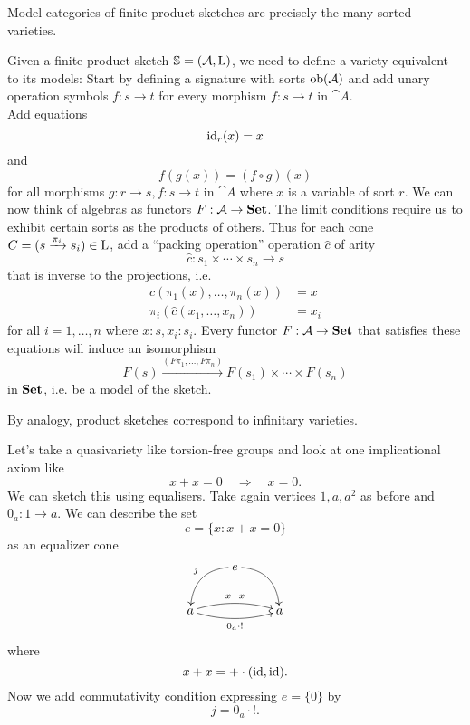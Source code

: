 \begin{Proposition}
Model categories of finite product sketches are precisely the many-sorted varieties.
\end{Proposition}
\begin{Proof}
Given a finite product sketch $\mathbb S = (\mathcal{A}, \textrm{L})$, we need to define a variety equivalent to its models: Start by defining a signature with sorts $\textrm{ob}(\mathcal{A})$ and add unary operation symbols $f : s \to t$ for every morphism $f : s \to t$ in $\cat A$. \\

Add equations
\[ \textrm{id}_r(x) = x \]
and
\[ f(g(x)) = (f \circ g)(x)  \]
for all morphisms $g : r \to s, f : s \to t$ in $\cat A$ where $x$ is a variable of sort $r$. We can now think of algebras as functors $F : \mathcal{A} \to \mathbf{Set}$. The limit conditions require us to exhibit certain sorts as the products of others. Thus for each cone $C = (s \xrightarrow{\pi_i} s_i) \in \textrm{L}$, add a ``packing operation'' operation $\hat c$ of arity
\[ \hat c : s_1 \times \cdots \times s_n \to s \]
that is inverse to the projections, i.e.
\begin{align*}
\hat c(\pi_1(x), \ldots, \pi_n(x)) &= x \\
\pi_i(\hat c(x_1, \ldots, x_n)) &= x_i
\end{align*}
for all $i=1,\ldots,n$ where $x : s, x_i : s_i$.
Every functor $F : \mathcal{A} \to \mathbf{Set}$ that satisfies these equations will induce an isomorphism
\[ F(s) \xrightarrow{(F\pi_1,\ldots, F\pi_n)} F(s_1) \times \cdots \times F(s_n) \]
in $\mathbf{Set}$, i.e. be a model of the sketch.
\end{Proof}

By analogy, product sketches correspond to infinitary varieties.

\begin{Example}
Let's take a quasivariety like torsion-free groups and look at one implicational axiom like
\[ x + x = 0 \quad \Rightarrow \quad x = 0. \]
We can sketch this using equalisers. Take again vertices $1,a,a^2$ as before and $0_a : 1 \to a$. We can describe the set
\[ e = \{ x : x + x = 0 \} \]
as an equalizer cone
\[
\xymatrix{
& e \ar@/_1pc/[ld]_{j} \ar@/^1pc/[rd] & \\
a \ar@/^/[rr]^{x + x} \ar@/_/[rr]_{0_a \circ !} & & a
}\]
where \[ x + x = + \cdot (\textrm{id},\textrm{id}). \]
Now we add commutativity condition expressing $e = \{0\}$ by \[ j = 0_a\cdot !. \]
\end{Example}

